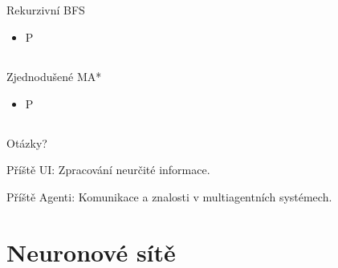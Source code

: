 \documentclass{beamer}
\begin{document}
\subsection{}
\begin{frame}{Rekurzivní BFS}
\begin{itemize}
\item P
\end{itemize}
\end{frame}

\subsection{}
\begin{frame}{Zjednodušené MA*}
\begin{itemize}
\item P
\end{itemize}
\end{frame}

\subsection{}
\begin{frame}{Otázky?}
\begin{center}
Příště UI: Zpracování neurčité informace.

Příště Agenti: Komunikace a znalosti v multiagentních systémech.
\end{center}
\end{frame}

\section{Neuronové sítě}
\end{document}
